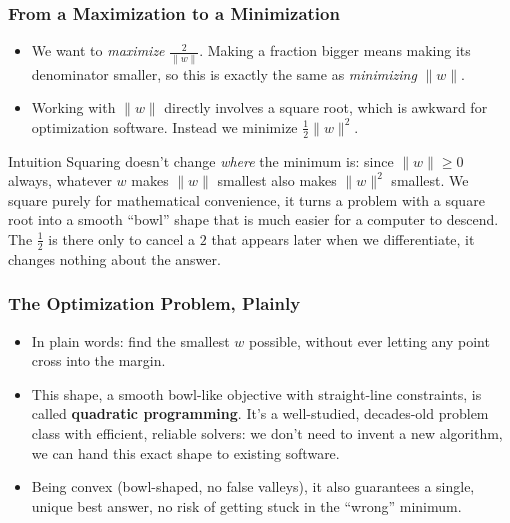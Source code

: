 \begin{frame}[fragile] \frametitle{From a Maximization to a Minimization}
\begin{itemize}
\item We want to \emph{maximize} $\frac{2}{\|w\|}$. Making a fraction bigger means making its denominator smaller, so this is exactly the same as \emph{minimizing} $\|w\|$.
\item Working with $\|w\|$ directly involves a square root, which is awkward for optimization software. Instead we minimize $\frac{1}{2}\|w\|^2$.
\end{itemize}
\begin{block}{Intuition}
Squaring doesn't change \emph{where} the minimum is: since $\|w\|\geq 0$ always, whatever $w$
makes $\|w\|$ smallest also makes $\|w\|^2$ smallest. We square purely for mathematical
convenience, it turns a problem with a square root into a smooth ``bowl'' shape that is much
easier for a computer to descend. The $\frac{1}{2}$ is there only to cancel a $2$ that appears
later when we differentiate, it changes nothing about the answer.
\end{block}
\end{frame}

\begin{frame}[fragile] \frametitle{The Optimization Problem, Plainly}
\begin{center}
\end{center}
\begin{itemize}
\item In plain words: find the smallest $w$ possible, without ever letting any point cross into the margin.
\item This shape, a smooth bowl-like objective with straight-line constraints, is called \textbf{quadratic programming}. It's a well-studied, decades-old problem class with efficient, reliable solvers: we don't need to invent a new algorithm, we can hand this exact shape to existing software.
\item Being convex (bowl-shaped, no false valleys), it also guarantees a single, unique best answer, no risk of getting stuck in the ``wrong'' minimum.
\end{itemize}
\end{frame}

